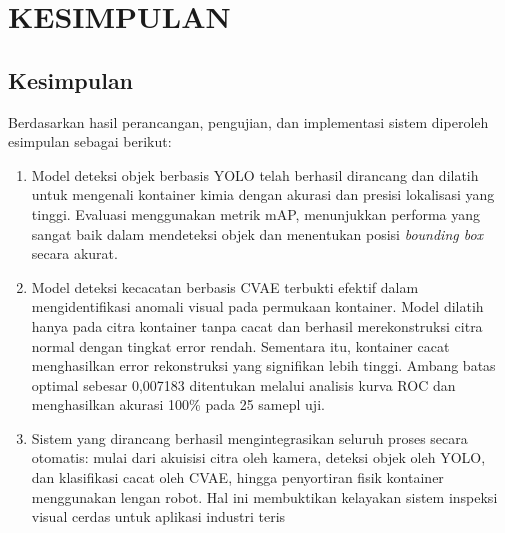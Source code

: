 \chapter{KESIMPULAN}
\section{Kesimpulan}
Berdasarkan hasil perancangan, pengujian, dan implementasi sistem
diperoleh esimpulan sebagai berikut:
\begin{enumerate}
  \item Model deteksi objek berbasis YOLO telah berhasil dirancang
    dan dilatih untuk mengenali kontainer kimia dengan akurasi dan
    presisi lokalisasi yang tinggi. Evaluasi menggunakan metrik mAP,
    menunjukkan performa yang sangat baik
    dalam mendeteksi objek dan menentukan posisi \textit{bounding
    box} secara akurat.
  \item Model deteksi kecacatan berbasis CVAE terbukti efektif dalam
    mengidentifikasi anomali visual pada permukaan kontainer. Model
    dilatih hanya pada citra kontainer tanpa cacat dan berhasil
    merekonstruksi citra normal dengan tingkat error rendah.
    Sementara itu, kontainer cacat menghasilkan error rekonstruksi
    yang signifikan lebih tinggi. Ambang batas optimal sebesar
    0,007183 ditentukan melalui analisis kurva ROC dan menghasilkan
    akurasi 100\% pada 25 samepl uji.
  \item Sistem yang dirancang berhasil mengintegrasikan seluruh
    proses secara otomatis: mulai dari akuisisi citra oleh kamera,
    deteksi objek oleh YOLO, dan klasifikasi cacat oleh CVAE, hingga
    penyortiran fisik kontainer menggunakan lengan robot. Hal ini
    membuktikan kelayakan sistem inspeksi visual cerdas untuk
    aplikasi industri teris
\end{enumerate}

\vspace{1em}

